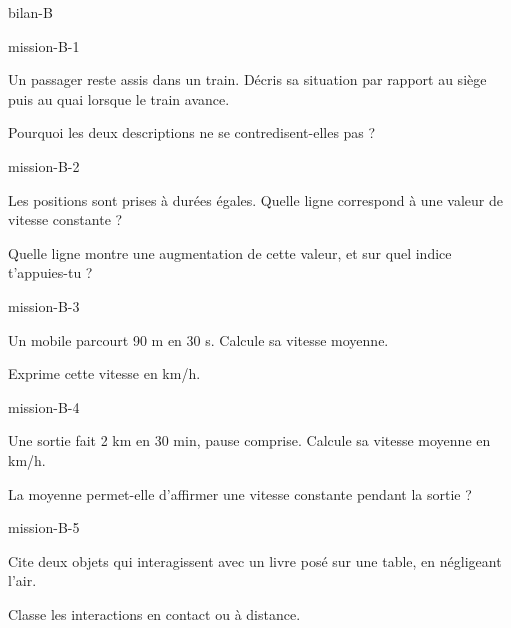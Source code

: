 \documentclass[12pt,twoside,openany]{book}
\begin{document}
\label{bilan-B}
\begin{pcFiche}{bilan-B}
\begin{blocLivre}{mission-B-1}
\begin{questions}
\item Un passager reste assis dans un train. Décris sa situation par rapport au siège puis au quai lorsque le train avance.
\item Pourquoi les deux descriptions ne se contredisent-elles pas ?
\end{questions}
\end{blocLivre}
\begin{blocLivre}{mission-B-2}
\begin{questions}
\item Les positions sont prises à durées égales. Quelle ligne correspond à une valeur de vitesse constante ?
\item Quelle ligne montre une augmentation de cette valeur, et sur quel indice t’appuies-tu ?
\end{questions}
\end{blocLivre}
\begin{blocLivre}{mission-B-3}
\begin{questions}
\item Un mobile parcourt 90 m en 30 s. Calcule sa vitesse moyenne.
\item Exprime cette vitesse en km/h.
\end{questions}
\end{blocLivre}
\begin{blocLivre}{mission-B-4}
\begin{questions}
\item Une sortie fait 2 km en 30 min, pause comprise. Calcule sa vitesse moyenne en km/h.
\item La moyenne permet-elle d’affirmer une vitesse constante pendant la sortie ?
\end{questions}
\end{blocLivre}
\begin{blocLivre}{mission-B-5}
\begin{questions}
\item Cite deux objets qui interagissent avec un livre posé sur une table, en négligeant l’air.
\item Classe les interactions en contact ou à distance.
\end{questions}
\end{blocLivre}
\end{pcFiche}
\end{document}
